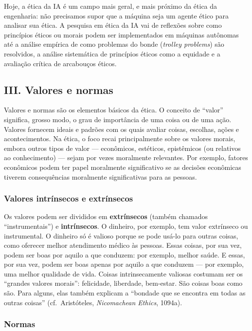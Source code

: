 \documentclass[
  11pt,
]{article}
\begin{document}
Hoje, a ética da IA é um campo mais geral, e mais próximo da ética da
engenharia: não precisamos supor que a máquina seja um agente ético para
analisar sua ética. A pesquisa em ética da IA vai de reflexões sobre
como princípios éticos ou morais podem ser implementados em máquinas
autônomas até a análise empírica de como problemas do bonde
(\emph{trolley problems}) são resolvidos, a análise sistemática de
princípios éticos como a equidade e a avaliação crítica de arcabouços
éticos.

\subsection{III. Valores e normas}\label{iii.-valores-e-normas}

Valores e normas são os elementos básicos da ética. O conceito de
``valor'' significa, grosso modo, o grau de importância de uma coisa ou
de uma ação. Valores fornecem ideais e padrões com os quais avaliar
coisas, escolhas, ações e acontecimentos. Na ética, o foco recai
principalmente sobre os valores morais, embora outros tipos de valor ---
econômicos, estéticos, epistêmicos (ou relativos ao conhecimento) ---
sejam por vezes moralmente relevantes. Por exemplo, fatores econômicos
podem ter papel moralmente significativo se as decisões econômicas
tiverem consequências moralmente significativas para as pessoas.

\subsubsection{Valores intrínsecos e
extrínsecos}\label{valores-intruxednsecos-e-extruxednsecos}

Os valores podem ser divididos em \textbf{extrínsecos} (também chamados
``instrumentais'') e \textbf{intrínsecos}. O dinheiro, por exemplo, tem
valor extrínseco ou instrumental. O dinheiro só é valioso porque se pode
usá-lo para outras coisas, como oferecer melhor atendimento médico às
pessoas. Essas coisas, por sua vez, podem ser boas por aquilo a que
conduzem: por exemplo, melhor saúde. E essas, por sua vez, podem ser
boas apenas por aquilo a que conduzem --- por exemplo, uma melhor
qualidade de vida. Coisas intrinsecamente valiosas costumam ser os
``grandes valores morais'': felicidade, liberdade, bem-estar. São coisas
boas como são. Para alguns, elas também explicam a ``bondade que se
encontra em todas as outras coisas'' (cf.~Aristóteles, \emph{Nicomachean
Ethics}, 1094a).

\subsubsection{Normas}\label{normas}
\end{document}
